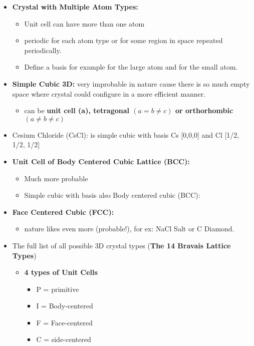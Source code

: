 \begin{itemize}
\begin{enumerate}
\begin{itemize}
        \end{itemize}
    \end{enumerate}
    \item \textbf{Crystal with Multiple Atom Types:}
    \begin{itemize}
        \item Unit cell can have more than one atom
        \item periodic for each atom type or for some region in space repeated periodically.
        \item Define a basis for example for the large atom and for the small atom.
    \end{itemize}
    \item \textbf{Simple Cubic 3D:} very improbable in nature cause there is so much empty space where crystal could configure in a more efficient manner.
    \begin{itemize}
        \item can be \textbf{unit cell (a), tetragonal $(a = b \neq c)$ or orthorhombic $(a \neq b \neq c)$}
    \end{itemize}
    \item Cesium Chloride (CsCl): is simple cubic with basis Cs [0,0,0] and Cl [1/2, 1/2, 1/2]
    \item \textbf{Unit Cell of Body Centered Cubic Lattice (BCC):}
    \begin{itemize}
        \item Much more probable 
        \item Simple cubic with basis also Body centered cubic (BCC):
    \end{itemize}
    \item \textbf{Face Centered Cubic (FCC):}
    \begin{itemize}
        \item nature likes even more (probable!), for ex: NaCl Salt or C Diamond.
    \end{itemize}
    \item The full list of all possible 3D crystal types (\textbf{The 14 Bravais Lattice Types})
    \begin{itemize}
        \item \textbf{4 types of Unit Cells }
        \begin{itemize}
        \item P = primitive
        \item I = Body-centered
        \item F = Face-centered 
        \item C = side-centered

\end{itemize}
\end{itemize}
\end{itemize}
